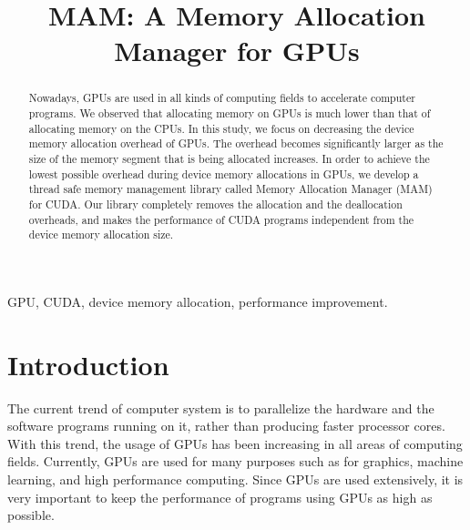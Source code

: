 \documentclass[conference]{IEEEtran}
\begin{document}
\title{MAM: A Memory Allocation Manager for GPUs}

\author{
	\and
}


\maketitle

\begin{abstract}
Nowadays, GPUs are used in all kinds of computing fields to accelerate computer programs. We observed that allocating memory on GPUs is much lower than that of allocating memory on the CPUs. In this study, we focus on decreasing the device memory allocation overhead of GPUs. The overhead becomes significantly larger as the size of the memory segment that is being allocated increases.  In order to achieve the lowest possible overhead during device memory allocations in GPUs, we develop a thread safe memory management library called Memory Allocation Manager (MAM) for CUDA. Our library  completely removes the allocation and the deallocation overheads, and makes the performance of CUDA programs independent from the device memory allocation size.
\end{abstract}

\begin{IEEEkeywords}
GPU, CUDA, device memory allocation, performance improvement.
\end{IEEEkeywords}


\IEEEpeerreviewmaketitle



\section{Introduction}
The current trend of computer system is to parallelize the hardware and the software programs running on it, rather than producing faster processor cores. With this trend, the usage of GPUs has been increasing in all areas of computing fields. Currently, GPUs are used for many purposes such as for graphics, machine learning, and high performance computing. Since GPUs are used extensively, it is very important to keep the performance of programs using GPUs as high as possible.
\end{document}
